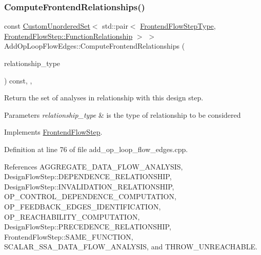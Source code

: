 \subsubsection{\texorpdfstring{Compute\+Frontend\+Relationships()}{ComputeFrontendRelationships()}}
{\footnotesize\ttfamily const \hyperlink{classCustomUnorderedSet}{Custom\+Unordered\+Set}$<$ std\+::pair$<$ \hyperlink{frontend__flow__step_8hpp_afeb3716c693d2b2e4ed3e6d04c3b63bb}{Frontend\+Flow\+Step\+Type}, \hyperlink{classFrontendFlowStep_af7cf30f2023e5b99e637dc2058289ab0}{Frontend\+Flow\+Step\+::\+Function\+Relationship} $>$ $>$ Add\+Op\+Loop\+Flow\+Edges\+::\+Compute\+Frontend\+Relationships (\begin{DoxyParamCaption}\item[{const \hyperlink{classDesignFlowStep_a723a3baf19ff2ceb77bc13e099d0b1b7}{Design\+Flow\+Step\+::\+Relationship\+Type}}]{relationship\+\_\+type }\end{DoxyParamCaption}) const\hspace{0.3cm}{\ttfamily [override]}, {\ttfamily [private]}, {\ttfamily [virtual]}}



Return the set of analyses in relationship with this design step. 


\begin{DoxyParams}{Parameters}
{\em relationship\+\_\+type} & is the type of relationship to be considered \\
\hline
\end{DoxyParams}


Implements \hyperlink{classFrontendFlowStep_abeaff70b59734e462d347ed343dd700d}{Frontend\+Flow\+Step}.



Definition at line 76 of file add\+\_\+op\+\_\+loop\+\_\+flow\+\_\+edges.\+cpp.



References A\+G\+G\+R\+E\+G\+A\+T\+E\+\_\+\+D\+A\+T\+A\+\_\+\+F\+L\+O\+W\+\_\+\+A\+N\+A\+L\+Y\+S\+IS, Design\+Flow\+Step\+::\+D\+E\+P\+E\+N\+D\+E\+N\+C\+E\+\_\+\+R\+E\+L\+A\+T\+I\+O\+N\+S\+H\+IP, Design\+Flow\+Step\+::\+I\+N\+V\+A\+L\+I\+D\+A\+T\+I\+O\+N\+\_\+\+R\+E\+L\+A\+T\+I\+O\+N\+S\+H\+IP, O\+P\+\_\+\+C\+O\+N\+T\+R\+O\+L\+\_\+\+D\+E\+P\+E\+N\+D\+E\+N\+C\+E\+\_\+\+C\+O\+M\+P\+U\+T\+A\+T\+I\+ON, O\+P\+\_\+\+F\+E\+E\+D\+B\+A\+C\+K\+\_\+\+E\+D\+G\+E\+S\+\_\+\+I\+D\+E\+N\+T\+I\+F\+I\+C\+A\+T\+I\+ON, O\+P\+\_\+\+R\+E\+A\+C\+H\+A\+B\+I\+L\+I\+T\+Y\+\_\+\+C\+O\+M\+P\+U\+T\+A\+T\+I\+ON, Design\+Flow\+Step\+::\+P\+R\+E\+C\+E\+D\+E\+N\+C\+E\+\_\+\+R\+E\+L\+A\+T\+I\+O\+N\+S\+H\+IP, Frontend\+Flow\+Step\+::\+S\+A\+M\+E\+\_\+\+F\+U\+N\+C\+T\+I\+ON, S\+C\+A\+L\+A\+R\+\_\+\+S\+S\+A\+\_\+\+D\+A\+T\+A\+\_\+\+F\+L\+O\+W\+\_\+\+A\+N\+A\+L\+Y\+S\+IS, and T\+H\+R\+O\+W\+\_\+\+U\+N\+R\+E\+A\+C\+H\+A\+B\+LE.

